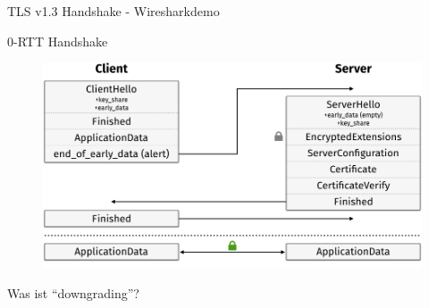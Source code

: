 \documentclass{f4_beamer_metropolis}
\begin{document}
\begin{frame}[standout]
  TLS v1.3 Handshake - Wiresharkdemo
\end{frame}

\begin{frame}{0-RTT Handshake}
  \begin{figure}[!h]
    \centering
    \vspace*{-0.25cm}
    \includegraphics[width=\linewidth]{./images/tls13-handshake-zero-rtt.png}
    \label{fig:tls13-handshake-zero-rtt}
    \autocite{taubert}
  \end{figure}
\end{frame}



\begin{frame}{Was ist \enquote{downgrading}?}

\end{frame}
\end{document}
